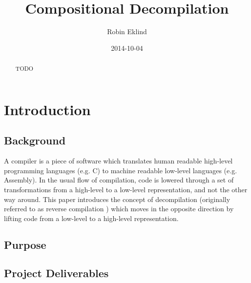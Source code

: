 \documentclass[12pt, a4paper]{article}
\title{Compositional Decompilation} %
\author{Robin Eklind}
\date{2014-10-04}
\begin{document}
\maketitle

\begin{abstract}
TODO
\end{abstract}

\pagebreak

\tableofcontents

\pagebreak



\section{Introduction}


\subsection{Background}

A compiler is a piece of software which translates human readable high-level
programming languages (e.g. C) to machine readable low-level languages (e.g.
Assembly). In the usual flow of compilation, code is lowered through a set of
transformations from a high-level to a low-level representation, and not the
other way around. This paper introduces the concept of decompilation (originally
referred to as reverse compilation \cite{rev_comp}) which moves in the opposite
direction by lifting code from a low-level to a high-level representation.


\subsection{Purpose}


\subsection{Project Deliverables}
\end{document}

